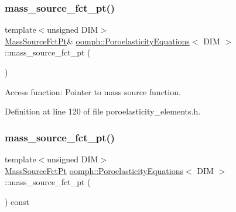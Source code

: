 \subsubsection{\texorpdfstring{mass\+\_\+source\+\_\+fct\+\_\+pt()}{mass\_source\_fct\_pt()}\hspace{0.1cm}{\footnotesize\ttfamily [1/2]}}
{\footnotesize\ttfamily template$<$unsigned D\+IM$>$ \\
\hyperlink{classoomph_1_1PoroelasticityEquations_a8edb2644708db2f2ae03254ea3143262}{Mass\+Source\+Fct\+Pt}\& \hyperlink{classoomph_1_1PoroelasticityEquations}{oomph\+::\+Poroelasticity\+Equations}$<$ D\+IM $>$\+::mass\+\_\+source\+\_\+fct\+\_\+pt (\begin{DoxyParamCaption}{ }\end{DoxyParamCaption})\hspace{0.3cm}{\ttfamily [inline]}}



Access function\+: Pointer to mass source function. 



Definition at line 120 of file poroelasticity\+\_\+elements.\+h.

\mbox{\label{classoomph_1_1PoroelasticityEquations_abdc8804cf42e7687e5ce9b10f2c1938e}} 
\subsubsection{\texorpdfstring{mass\+\_\+source\+\_\+fct\+\_\+pt()}{mass\_source\_fct\_pt()}\hspace{0.1cm}{\footnotesize\ttfamily [2/2]}}
{\footnotesize\ttfamily template$<$unsigned D\+IM$>$ \\
\hyperlink{classoomph_1_1PoroelasticityEquations_a8edb2644708db2f2ae03254ea3143262}{Mass\+Source\+Fct\+Pt} \hyperlink{classoomph_1_1PoroelasticityEquations}{oomph\+::\+Poroelasticity\+Equations}$<$ D\+IM $>$\+::mass\+\_\+source\+\_\+fct\+\_\+pt (\begin{DoxyParamCaption}{ }\end{DoxyParamCaption}) const\hspace{0.3cm}{\ttfamily [inline]}}



